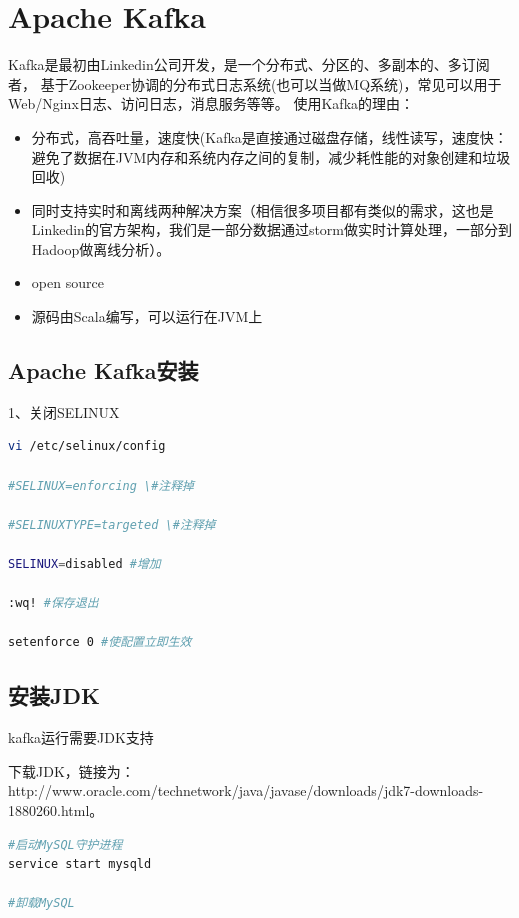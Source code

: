 \documentclass{book}
\begin{document}
\section{Apache Kafka}

Kafka是最初由Linkedin公司开发，是一个分布式、分区的、多副本的、多订阅者，
基于Zookeeper协调的分布式日志系统(也可以当做MQ系统)，常见可以用于Web/Nginx日志、访问日志，消息服务等等。
使用Kafka的理由：

\begin{itemize}
	\item{分布式，高吞吐量，速度快(Kafka是直接通过磁盘存储，线性读写，速度快：避免了数据在JVM内存和系统内存之间的复制，减少耗性能的对象创建和垃圾回收)}
	\item{同时支持实时和离线两种解决方案（相信很多项目都有类似的需求，这也是Linkedin的官方架构，我们是一部分数据通过storm做实时计算处理，一部分到Hadoop做离线分析）。}
	\item{open source}
	\item{源码由Scala编写，可以运行在JVM上}
\end{itemize}

\subsection{Apache Kafka安装}

1、关闭SELINUX

\begin{lstlisting}[language=Bash]
vi /etc/selinux/config

#SELINUX=enforcing \#注释掉

#SELINUXTYPE=targeted \#注释掉

SELINUX=disabled #增加

:wq! #保存退出

setenforce 0 #使配置立即生效
\end{lstlisting}

\subsection{安装JDK}

kafka运行需要JDK支持

下载JDK，链接为：http://www.oracle.com/technetwork/java/javase/downloads/jdk7-downloads-1880260.html。

\begin{lstlisting}[language=Bash]
#启动MySQL守护进程
service start mysqld

#卸载MySQL

\end{lstlisting}
\end{document}
